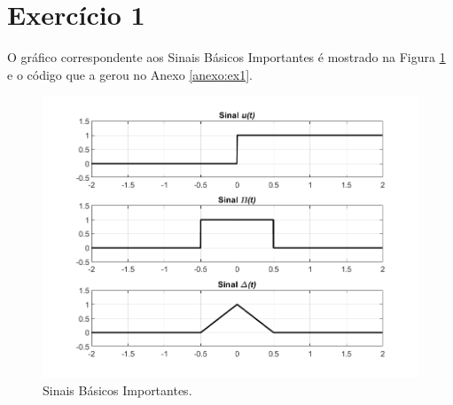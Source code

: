 \documentclass[a4paper,12pt,oneside,openany,table,xcdraw]{article}
\begin{document}
\newcommand{\thedepartment}{Faculdade de Engenharia Elétrica}
\newcommand{\thecourse}{FEELT}
\newcommand{\thetitle}{Resolução da Lista de Exercícios 1}
\newcommand{\thetype}{Trabalho de Princípios de Comunição}
\newcommand{\theproftitle}{Bacharel em Engenharia Elétrica}
\newcommand{\thestudent}{Lesly Viviane Montúfar Berrios\\
\centering11811ETE001}
\newcommand{\theadvisor}{Prof. Lorenço Santos Vasconcelos}
\newcommand{\thecity}{Uberlândia}

\thispagestyle{empty}



\onehalfspacing
\tableofcontents %
\newpage

\section{Exercício 1}
O gráfico correspondente aos Sinais Básicos Importantes é mostrado na Figura \ref{ex1:figure} e o código que a gerou no Anexo \ref{anexo:ex1}.

\vspace{0.4cm}
\begin{figure}[H]
\centering
\includegraphics[width=14cm]{ex1-fig}
\caption{Sinais Básicos Importantes.}
\label{ex1:figure}
\end{figure}
\end{document}
